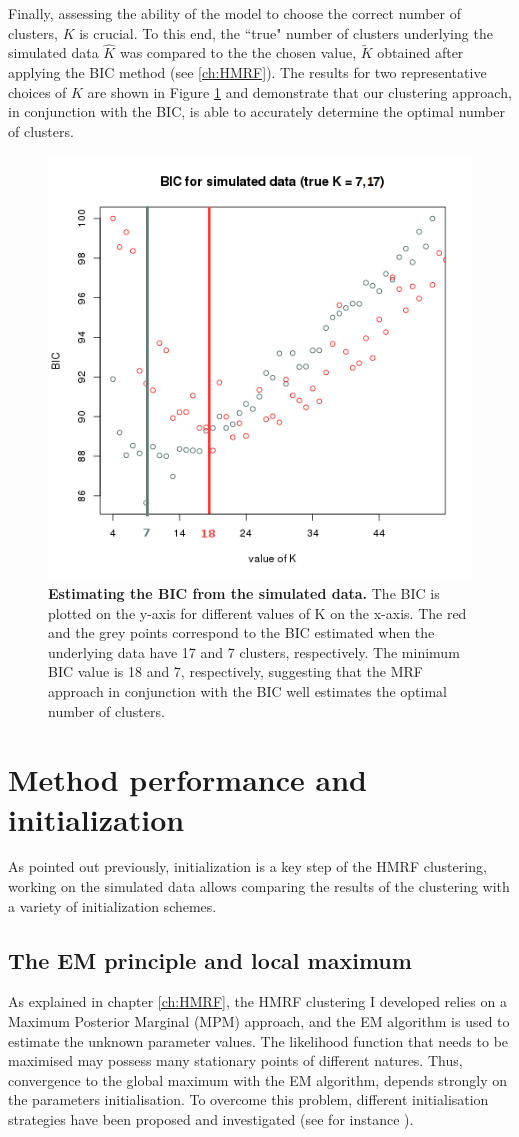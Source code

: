Finally, assessing the ability of the model to choose the correct number of clusters, $K$ is crucial. To this end, the ``true" number of clusters underlying the simulated data $\hat{K}$ was compared to the the chosen value, $\widetilde{K}$ obtained after applying the BIC method (see \ref{ch:HMRF}). The results for two representative choices of $K$ are shown in Figure \ref{fig:simulatedK} and demonstrate that our clustering approach, in conjunction with the BIC, is able to accurately determine the optimal number of clusters.\\

	\begin{figure}[H]
\centerline{\includegraphics[width=0.6\linewidth]{gfx/chapter5/simulated_k.png}}
\caption{{\bf Estimating the BIC from the simulated data.} The BIC is plotted on the y-axis for different values of K on the x-axis. The red and the grey points correspond to the BIC estimated when the underlying data have 17 and 7 clusters, respectively. The minimum BIC value is 18 and 7, respectively, suggesting that the MRF approach in conjunction with the BIC well estimates the optimal number of clusters.}
\label{fig:simulatedK}
	\end{figure}

\section{Method performance and initialization}\label{sec:method_comparison}
As pointed out previously, initialization is a key step of the HMRF clustering, working on the simulated data allows comparing the results of the clustering with a variety of initialization schemes.
	\subsection{The EM principle and local maximum}
As explained in chapter \ref{ch:HMRF}, the HMRF clustering I developed relies on a Maximum Posterior Marginal (MPM) approach, and the EM algorithm is used to estimate the unknown parameter values. The likelihood function that needs to be maximised may possess many stationary points of different natures. Thus, convergence to the global maximum with the EM algorithm, depends strongly on the parameters initialisation. To overcome this problem, different initialisation strategies have been proposed and investigated (see for instance \cite{biernacki03,karlis03,mclachlan04}).\\

